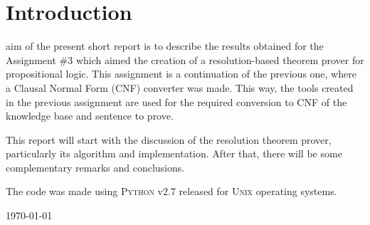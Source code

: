\documentclass[11pt,journal,compsoc]{IEEEtran}
\begin{document}
\section{Introduction}

 aim of the present short report is to describe the results obtained for the Assignment \#3 which aimed the creation of a resolution-based theorem prover for propositional logic. This assignment is a continuation of the previous one, where a Clausal Normal Form (CNF) converter was made. This way, the tools created in the previous assignment are used for the required conversion to CNF of the knowledge base and sentence to prove.

This report will start with the discussion of the resolution theorem prover, particularly its algorithm and implementation. After that, there will be some complementary remarks and conclusions.

The code was made using \textsc{Python} v2.7 released for \textsc{Unix} operating systems.

\hfill 
 
\hfill \today
\end{document}
